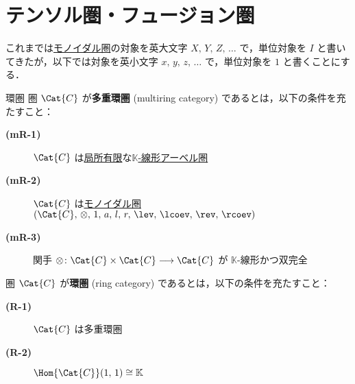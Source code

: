 \documentclass[TQFT_main]{subfiles}
\begin{document}
\section{テンソル圏・フュージョン圏}

\begin{marker}
    これまでは\hyperref[redef:monoidal-category]{モノイダル圏}の対象を英大文字 $X,\, Y,\, Z,\, \dots$ で，単位対象を $I$ と書いてきたが，以下では対象を英小文字 $x,\, y,\, z,\, \dots$ で，単位対象を $1$ と書くことにする．
\end{marker}

\begin{mydef}[label=def:ringcat]{環圏}
    圏 $\Cat{C}$ が\textbf{多重環圏} (multiring category) であるとは，以下の条件を充たすこと：
    \begin{description}
        \item[\textbf{(mR-1)}] $\Cat{C}$ は\hyperref[def:finite-abcat]{局所有限}な\hyperref[def:additive-cat]{$\mathbb{K}$-線形アーベル圏}
        \item[\textbf{(mR-2)}] $\Cat{C}$ は\hyperref[redef:rigid]{モノイダル圏} $(\Cat{C},\, \otimes,\, 1,\, a,\, l,\, r,\, \lev,\, \lcoev,\, \rev,\, \rcoev)$
        \item[\textbf{(mR-3)}] 関手 $\otimes \colon \Cat{C} \times \Cat{C} \lto \Cat{C}$ が $\mathbb{K}$-線形かつ双完全
    \end{description}
    圏 $\Cat{C}$ が\textbf{環圏} (ring category) であるとは，以下の条件を充たすこと：
    \begin{description}
        \item[\textbf{(R-1)}] $\Cat{C}$ は多重環圏
        \item[\textbf{(R-2)}] $\Hom{\Cat{C}} (1,\, 1) \cong \mathbb{K}$ 
    \end{description}
\end{mydef}
\end{document}
